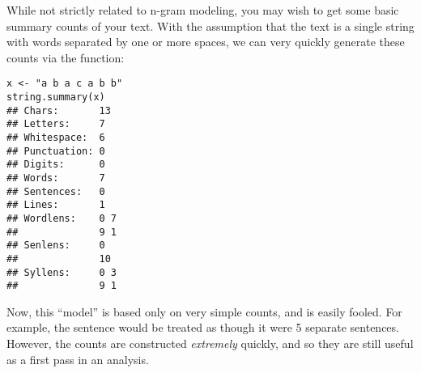 
While not strictly related to n-gram modeling, you may wish to get some basic
summary counts of your text.  With the assumption that the text is a single
string with words separated by one or more spaces, we can very quickly generate
these counts via the  function:

\begin{lstlisting}[language=rr]
x <- "a b a c a b b"
string.summary(x)
## Chars:       13
## Letters:     7
## Whitespace:  6
## Punctuation: 0
## Digits:      0
## Words:       7
## Sentences:   0
## Lines:       1 
## Wordlens:    0 7 
##              9 1 
## Senlens:     0 
##              10 
## Syllens:     0 3 
##              9 1 
\end{lstlisting}


Now, this ``model'' is based only on very simple counts, and is easily fooled.
For example, the sentence   would be treated as though it were 5 separate sentences.
However, the counts are constructed \emph{extremely} quickly, and so they are
still useful as a first pass in an analysis.
